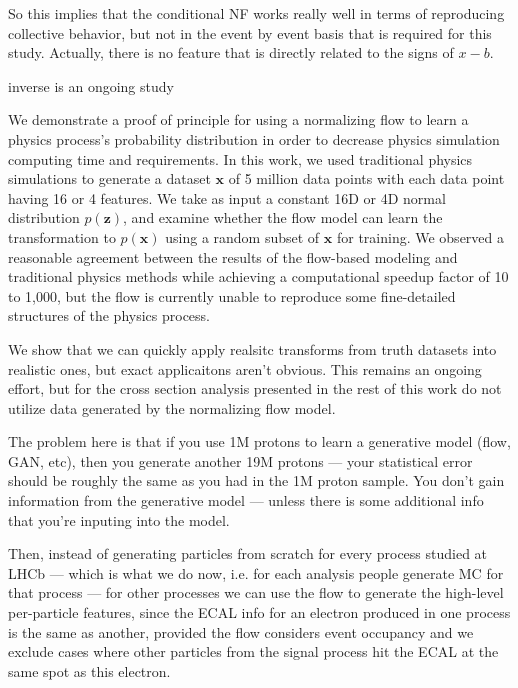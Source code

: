 So this implies that the conditional NF works really well in terms of reproducing collective behavior, but not in the event by event basis that is required for this study. Actually, there is no feature that is directly related to the signs of $x-b$.
    
    
    
    inverse is an ongoing study
    
    We demonstrate a proof of principle for using a normalizing flow to learn a physics process's probability distribution in order to decrease physics simulation computing time and requirements. In this work, we used traditional physics simulations to generate a dataset $\mathbf{x}$ of 5 million data points with each data point having 16 or 4 features.  We take as input a constant 16D or 4D normal distribution $p(\mathbf{z})$, and examine whether the flow model can learn the transformation to $p(\mathbf{x})$ using a random subset of $\mathbf{x}$ for training. We observed a reasonable agreement between the results of the flow-based modeling and traditional physics methods while achieving a computational speedup factor of 10 to 1,000, but the flow is currently unable to reproduce some fine-detailed structures of the physics process.
    
    
    \parencite{Radhakrishnan2020OverparameterizedMemory}

    We show that we can quickly apply realsitc transforms from truth datasets into realistic ones, but exact applicaitons aren't obvious. This remains an ongoing effort, but for the cross section analysis presented in the rest of this work do not utilize data generated by the normalizing flow model. 


    The problem here is that if you use 1M protons to learn a generative model (flow, GAN, etc), then you generate another 19M protons — your statistical error should be roughly the same as you had in the 1M proton sample. You don’t gain information from the generative model — unless there is some additional info that you’re inputing into the model.

    Then, instead of generating particles from scratch for every process studied at LHCb — which is what we do now, i.e. for each analysis people generate MC for that process — for other processes we can use the flow to generate the high-level per-particle features, since the ECAL info for an electron produced in one process is the same as another, provided the flow considers event occupancy and we exclude cases where other particles from the signal process hit the ECAL at the same spot as this electron.

